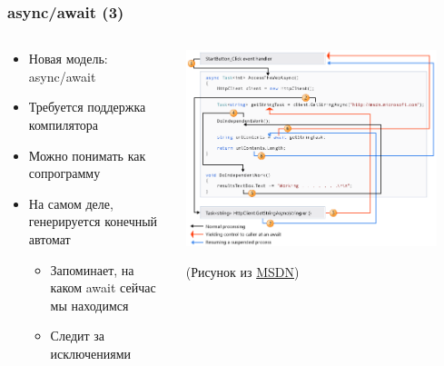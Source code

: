 \documentclass[xetex,mathserif,serif]{beamer}
\begin{document}
	\begin{frame}
		\frametitle{async/await (3)}
		\begin{columns}
			\begin{column}{0.5\textwidth}
				\begin{itemize}
					\item Новая модель: async/await
					\item Требуется поддержка компилятора
					\item Можно понимать как сопрограмму
					\item На самом деле, генерируется конечный автомат
					\begin{itemize}
						\item Запоминает, на каком await сейчас мы находимся
						\item Следит за исключениями
					\end{itemize}
				\end{itemize}
			\end{column}
			\begin{column}{0.5\textwidth}
				\begin{center}
					\includegraphics[width=0.9\textwidth]{asyncAwait.png}

					\begin{footnotesize}(Рисунок из \href{https://msdn.microsoft.com/library/hh191443(vs.110).aspx}{MSDN})\end{footnotesize}
				\end{center}
			\end{column}
		\end{columns}
	\end{frame}
\end{document}
